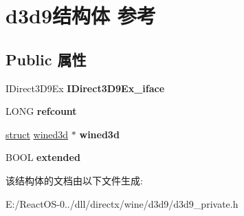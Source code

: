 \hypertarget{structd3d9}{}\section{d3d9结构体 参考}
\label{structd3d9}
\subsection*{Public 属性}
\begin{DoxyCompactItemize}
\item 
\mbox{\label{structd3d9_ae0c9a7ecc145be86c7ebf812fa3bc23b}} 
I\+Direct3\+D9\+Ex {\bfseries I\+Direct3\+D9\+Ex\+\_\+iface}
\item 
\mbox{\label{structd3d9_a7944287cc3e1d337f9d5f72884c047ce}} 
L\+O\+NG {\bfseries refcount}
\item 
\mbox{\label{structd3d9_a0183075e65b8a6b73ee832b75fa3ee2e}} 
\hyperlink{interfacestruct}{struct} \hyperlink{structwined3d}{wined3d} $\ast$ {\bfseries wined3d}
\item 
\mbox{\label{structd3d9_a89c45329cf2fb8b5ce7b9351896eba39}} 
B\+O\+OL {\bfseries extended}
\end{DoxyCompactItemize}


该结构体的文档由以下文件生成\+:\begin{DoxyCompactItemize}
\item 
E\+:/\+React\+O\+S-\/0../dll/directx/wine/d3d9/d3d9\+\_\+private.\+h\end{DoxyCompactItemize}
